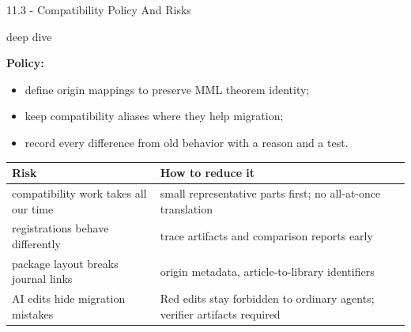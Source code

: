 \documentclass[aspectratio=169,11pt]{beamer}
\newcommand{\deepdivetag}{\hfill\colorbox{black!15}{\textcolor{black!65}{\strut\scriptsize\sffamily deep dive}}}
\begin{document}
\begin{frame}[fragile,t]{11.3 - Compatibility Policy And Risks\deepdivetag}
\smallskip
\textbf{Policy:}
\begin{itemize}
\setlength{\itemsep}{1pt}
\setlength{\parsep}{0pt}
\setlength{\parskip}{0pt}
\item define origin mappings to preserve MML theorem identity;
\item keep compatibility aliases where they help migration;
\item record every difference from old behavior with a reason and a test.
\end{itemize}
\begin{footnotesize}
\setlength{\tabcolsep}{3pt}
\renewcommand{\arraystretch}{1.15}
\begin{tabularx}{\textwidth}{>{\raggedright\arraybackslash}X>{\raggedright\arraybackslash}X}
\toprule
\textbf{Risk} & \textbf{How to reduce it} \\
\midrule
compatibility work takes all our time & small representative parts first; no all-at-once translation \\
registrations behave differently & trace artifacts and comparison reports early \\
package layout breaks journal links & origin metadata, article-to-library identifiers \\
AI edits hide migration mistakes & Red edits stay forbidden to ordinary agents; verifier artifacts required \\
\bottomrule
\end{tabularx}
\end{footnotesize}

\end{frame}
\end{document}
